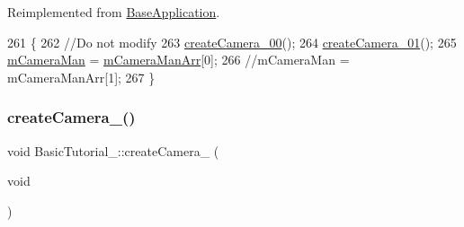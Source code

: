 Reimplemented from \hyperlink{class_base_application_afa9d51527763cf9aee9cd4e1b1039d55}{Base\+Application}.


\begin{DoxyCode}
261                                         \{
262     \textcolor{comment}{//Do not modify}
263     \hyperlink{class_basic_tutorial__00_a3479c50dbf8dc06a7ea77014eb94c6e7}{createCamera\_00}();
264     \hyperlink{class_basic_tutorial__00_a8745a127adeb69fa769f832fd41412c0}{createCamera\_01}();
265     \hyperlink{class_base_application_a9ae38dea6316058549151fff66a91fcd}{mCameraMan} = \hyperlink{class_basic_tutorial__00_a700c07f924c71e9fa1885a46f599d934}{mCameraManArr}[0];
266     \textcolor{comment}{//mCameraMan = mCameraManArr[1];}
267 \}
\end{DoxyCode}
\mbox{\label{class_basic_tutorial__00_a3479c50dbf8dc06a7ea77014eb94c6e7}} 
\subsubsection{\texorpdfstring{create\+Camera\+\_()}{createCamera\_00()}}
{\footnotesize\ttfamily void Basic\+Tutorial\+\_\+::create\+Camera\+\_ (\begin{DoxyParamCaption}\item[{void}]{ }\end{DoxyParamCaption})\hspace{0.3cm}{\ttfamily [protected]}}


